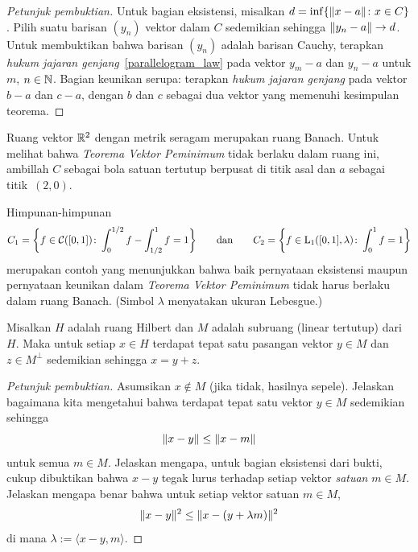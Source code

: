 \begin{proof}[\emph{Petunjuk pembuktian}]  Untuk bagian eksistensi, misalkan $d = \inf\{\lVert x - a\rVert\colon x \in C\}$.  Pilih suatu barisan
$(y_n)$ vektor dalam $C$ sedemikian sehingga $\lVert y_n - a\rVert \rightarrow d$.  Untuk membuktikan bahwa barisan $(y_n)$ adalah barisan Cauchy, terapkan
\emph{hukum jajaran genjang}~\ref{parallelogram_law} pada vektor $y_m - a$ dan $y_n - a$ untuk $m$, $n \in \mathbb{N}$.  Bagian keunikan
serupa: terapkan \emph{hukum jajaran genjang} pada vektor $b - a$ dan $c - a$, dengan $b$ dan $c$ sebagai dua vektor yang
memenuhi kesimpulan teorema.  \ns
\end{proof}

\begin{exam} Ruang vektor $\mathbb{R}^2$ dengan metrik seragam merupakan ruang Banach. Untuk melihat
bahwa \emph{Teorema Vektor Peminimum} tidak berlaku dalam ruang ini, ambillah $C$ sebagai
bola satuan tertutup berpusat di titik asal dan $a$ sebagai titik~$(2,0)$.
\end{exam}

\begin{exam} Himpunan-himpunan
   \[ C_1 = \biggl\{f \in \mathcal{C}([0,1])\colon \int_0^{1/2}f - \int_{1/2}^1f = 1\biggr\} \qquad \text{dan} \qquad
                               C_2 = \biggl\{f \in \mathrm{L_{1}}([0,1],\lambda)\colon \int_0^1f = 1\biggr\} \]
merupakan contoh yang menunjukkan bahwa baik pernyataan eksistensi maupun pernyataan keunikan dalam \emph{Teorema Vektor Peminimum}
tidak harus berlaku dalam ruang Banach. (Simbol $\lambda$ menyatakan ukuran Lebesgue.)
\end{exam}

\begin{thm}\label{thm_vec_decomp} Misalkan $H$ adalah ruang Hilbert dan
$M$ adalah subruang (linear tertutup) dari~$H$.
Maka untuk setiap $x \in H$ terdapat tepat satu pasangan vektor $y \in M$ dan $z \in M^\perp$ sedemikian sehingga $x = y + z$.
\end{thm}

\begin{proof}[\emph{Petunjuk pembuktian}] Asumsikan $x \notin M$ (jika tidak, hasilnya sepele). Jelaskan bagaimana kita
mengetahui bahwa terdapat tepat satu vektor $y \in M$ sedemikian sehingga
   \begin{equation} \lVert x - y\rVert \le \lVert x - m\rVert \end{equation}
untuk semua $m \in M$.  Jelaskan mengapa, untuk bagian eksistensi dari bukti, cukup dibuktikan
bahwa $x - y$ tegak lurus terhadap setiap vektor \emph{satuan} $m \in M$.  Jelaskan mengapa benar
bahwa untuk setiap vektor satuan $m \in M$,
   \begin{equation} \lVert x - y\rVert^2 \le \lVert x - (y + \lambda m)\rVert^2 \end{equation}
di mana $\lambda := \langle x - y, m \rangle$.  \ns
\end{proof}

